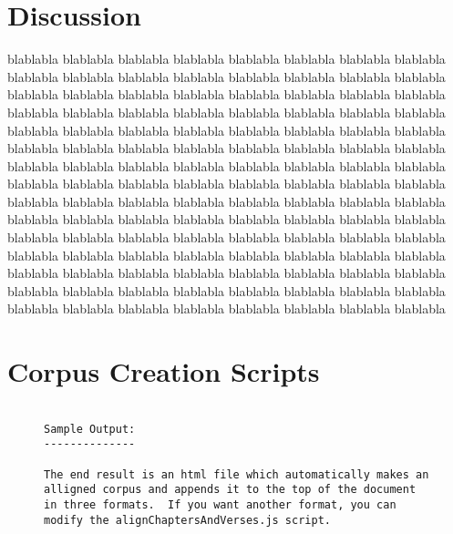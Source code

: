 \documentclass[12pt]{article}
\begin{document}
\section{Discussion} 

blablabla blablabla blablabla 
blablabla blablabla blablabla 
blablabla blablabla blablabla 
blablabla blablabla blablabla 
blablabla blablabla blablabla 
blablabla blablabla blablabla 
blablabla blablabla blablabla 
blablabla blablabla blablabla 
blablabla blablabla blablabla 
blablabla blablabla blablabla 
blablabla blablabla blablabla 
blablabla blablabla blablabla 
blablabla blablabla blablabla 
blablabla blablabla blablabla 
blablabla blablabla blablabla 
blablabla blablabla blablabla 
blablabla blablabla blablabla 
blablabla blablabla blablabla 
blablabla blablabla blablabla 
blablabla blablabla blablabla 
blablabla blablabla blablabla 
blablabla blablabla blablabla 
blablabla blablabla blablabla 
blablabla blablabla blablabla 
blablabla blablabla blablabla 
blablabla blablabla blablabla 
blablabla blablabla blablabla 
blablabla blablabla blablabla 
blablabla blablabla blablabla 
blablabla blablabla blablabla 
blablabla blablabla blablabla 
blablabla blablabla blablabla 
blablabla blablabla blablabla 
blablabla blablabla blablabla 
blablabla blablabla blablabla 
blablabla blablabla blablabla 
blablabla blablabla blablabla 
blablabla blablabla blablabla 
blablabla blablabla blablabla 
blablabla blablabla blablabla 

\appendix 

\section {Corpus Creation Scripts}





\begin{figure}
\begin{verbatim}

Sample Output:
--------------

The end result is an html file which automatically makes an alligned corpus and appends it to the top of the document in three formats.  If you want another format, you can modify the alignChaptersAndVerses.js script.
\end{verbatim}
\end{figure}
\end{document}
